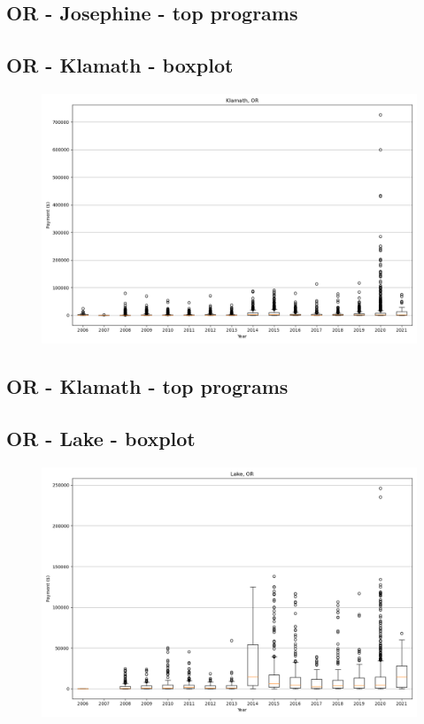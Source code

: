 \subsection*{OR - Josephine - top programs}

\newpage
\subsection*{OR - Klamath - boxplot}
\begin{figure}[h]
\centering
\includegraphics[width=7in]{../output/boxplots/counties/Klamath-OR_boxplot.png}
\end{figure}


\subsection*{OR - Klamath - top programs}

\newpage
\subsection*{OR - Lake - boxplot}
\begin{figure}[h]
\centering
\includegraphics[width=7in]{../output/boxplots/counties/Lake-OR_boxplot.png}
\end{figure}


